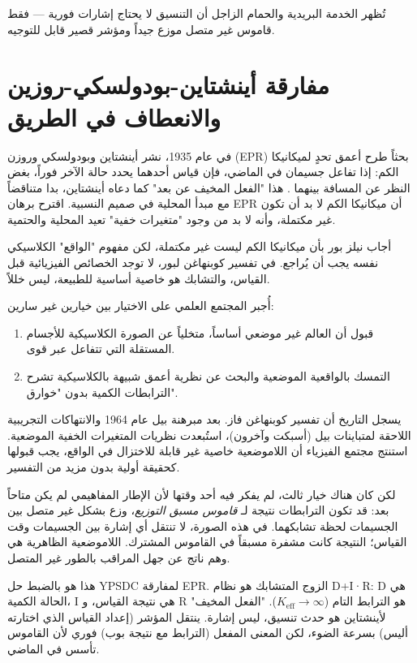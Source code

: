 \documentclass[12pt,a4paper]{article}
\begin{document}
	تُظهر الخدمة البريدية والحمام الزاجل أن التنسيق لا يحتاج إشارات فورية — فقط قاموس غير متصل موزع جيداً ومؤشر قصير قابل للتوجيه.
	
	\section{مفارقة أينشتاين-بودولسكي-روزين والانعطاف في الطريق}
	
	في عام 1935، نشر أينشتاين وبودولسكي وروزن (EPR) بحثاً طرح أعمق تحدٍ لميكانيكا الكم: إذا تفاعل جسيمان في الماضي، فإن قياس أحدهما يحدد حالة الآخر فوراً، بغض النظر عن المسافة بينهما \cite{EPR1935}. هذا "الفعل المخيف عن بعد" كما دعاه أينشتاين، بدا متناقضاً مع مبدأ المحلية في صميم النسبية. اقترح برهان EPR أن ميكانيكا الكم لا بد أن تكون غير مكتملة، وأنه لا بد من وجود "متغيرات خفية" تعيد المحلية والحتمية.
	
	أجاب نيلز بور بأن ميكانيكا الكم ليست غير مكتملة، لكن مفهوم "الواقع" الكلاسيكي نفسه يجب أن يُراجع. في تفسير كوبنهاغن لبور، لا توجد الخصائص الفيزيائية قبل القياس، والتشابك هو خاصية أساسية للطبيعة، ليس خللاً.
	
	أُجبر المجتمع العلمي على الاختيار بين خيارين غير سارين:
	\begin{enumerate}
		\item قبول أن العالم غير موضعي أساساً، متخلياً عن الصورة الكلاسيكية للأجسام المستقلة التي تتفاعل عبر قوى.
		\item التمسك بالواقعية الموضعية والبحث عن نظرية أعمق شبيهة بالكلاسيكية تشرح الترابطات الكمية بدون "خوارق".
	\end{enumerate}
	
	يسجل التاريخ أن تفسير كوبنهاغن فاز. بعد مبرهنة بيل عام 1964 والانتهاكات التجريبية اللاحقة لمتباينات بيل (أسبكت وآخرون)، استُبعدت نظريات المتغيرات الخفية الموضعية. استنتج مجتمع الفيزياء أن اللاموضعية خاصية غير قابلة للاختزال في الواقع، يجب قبولها كحقيقة أولية بدون مزيد من التفسير.
	
	لكن كان هناك خيار ثالث، لم يفكر فيه أحد وقتها لأن الإطار المفاهيمي لم يكن متاحاً بعد: قد تكون الترابطات نتيجة لـ \emph{قاموس مسبق التوزيع}، وزع بشكل غير متصل بين الجسيمات لحظة تشابكهما. في هذه الصورة، لا تنتقل أي إشارة بين الجسيمات وقت القياس؛ النتيجة كانت مشفرة مسبقاً في القاموس المشترك. اللاموضعية الظاهرية هي وهم ناتج عن جهل المراقب بالطور غير المتصل.
	
	هذا هو بالضبط حل YPSDC لمفارقة EPR. الزوج المتشابك هو نظام D+I·R: D هي الحالة الكمية، I هي نتيجة القياس، و R هو الترابط التام (\(K_{\mathrm{eff}} \to \infty\)). "الفعل المخيف" لأينشتاين هو حدث تنسيق، ليس إشارة. ينتقل المؤشر (إعداد القياس الذي اختارته أليس) بسرعة الضوء، لكن المعنى المفعل (الترابط مع نتيجة بوب) فوري لأن القاموس تأسس في الماضي.
	
\end{document}

